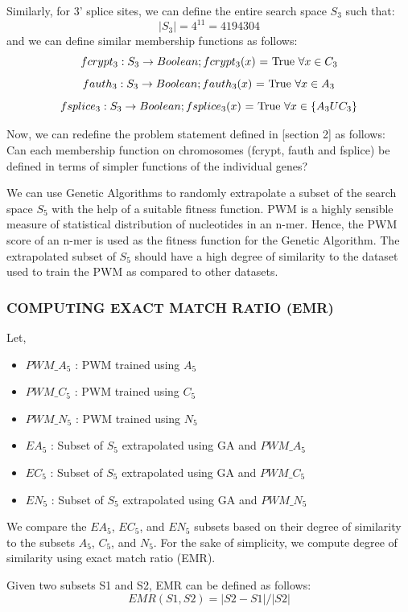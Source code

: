 \documentclass[12pt,a4paper]{article}
\begin{document}
	Similarly, for 3’ splice sites, we can define the entire search space $S_3$ such that:
	$$ |S_3| = 4^{11} = 4194304 $$
	and we can define similar membership functions as follows:
	$$ fcrypt_3:  S_3 \rightarrow Boolean; fcrypt_3(x)\textnormal{ = True  }\forall x \in C_3 $$
	$$ fauth_3: S_3 \rightarrow Boolean; fauth_3(x)\textnormal{ = True  }\forall x \in A_3 $$
	$$ fsplice_3: S_3 \rightarrow Boolean; fsplice_3(x)\textnormal{ = True  }\forall x \in \{A_3 U C_3\} $$
	
	Now, we can redefine the problem statement defined in [section 2] as follows:\\
	Can each membership function on chromosomes (fcrypt, fauth and fsplice) be defined in terms of simpler functions of the individual genes? \par
	
	We can use Genetic Algorithms to randomly extrapolate a subset of the search space $S_5$ with the help of a suitable fitness function. PWM is a highly sensible measure of statistical distribution of nucleotides in an n-mer. Hence, the PWM score of an n-mer is used as the fitness function for the Genetic Algorithm. The extrapolated subset of $S_5$ should have a high degree of similarity to the dataset used to train the PWM as compared to other datasets. \par
	
	\subsubsection{COMPUTING EXACT MATCH RATIO (EMR)}
	Let,
	\begin{itemize}
		\item $PWM\_A_5$ : PWM trained using $A_5$
		\item $PWM\_C_5$ : PWM trained using $C_5$
		\item $PWM\_N_5$ : PWM trained using $N_5$
		\item $EA_5$ : Subset of $S_5$ extrapolated using GA and $PWM\_A_5$
		\item $EC_5$ : Subset of $S_5$ extrapolated using GA and $PWM\_C_5$
		\item $EN_5$ : Subset of $S_5$ extrapolated using GA and $PWM\_N_5$
	\end{itemize}
	
	We compare the $EA_5$, $EC_5$, and $EN_5$ subsets based on their degree of similarity to the subsets $A_5$, $C_5$, and $N_5$. For the sake of simplicity, we compute degree of similarity using exact match ratio (EMR). \par
	Given two subsets S1 and S2, EMR can be defined as follows:
	$$ EMR(S1, S2) = |S2 - S1| / |S2| $$
	
\end{document}
